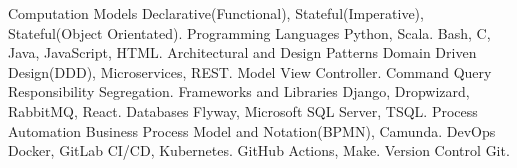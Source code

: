 \begin{cvskills}
  \cvskill
    {Computation Models} %
    { Declarative(Functional), Stateful(Imperative), Stateful(Object Orientated).} 
  \cvskill
    {Programming Languages} %
    {  Python, Scala. } 
  \cvskill
    {} %
    {  Bash, C, Java, JavaScript, HTML.} 
  \cvskill
    {Architectural and Design Patterns} %
    {  Domain Driven Design(DDD), Microservices, REST.}
  \cvskill
    {} %
    {  Model View Controller.} 
  \cvskill
    {} %
    {  Command Query Responsibility Segregation.} 
  \cvskill
    {Frameworks and Libraries} %
    {  Django, Dropwizard, RabbitMQ, React.} 
  \cvskill
  {Databases} %
  {  Flyway, Microsoft SQL Server, TSQL.} 
  \cvskill
    {Process Automation}
    { Business Process Model and Notation(BPMN), Camunda.}
  \cvskill
    {DevOps} %
    { Docker, GitLab CI/CD, Kubernetes.} %
  \cvskill
    {} %
    {  GitHub Actions, Make.} 
  \cvskill
  {Version Control} %
  { Git.} %
\end{cvskills}

